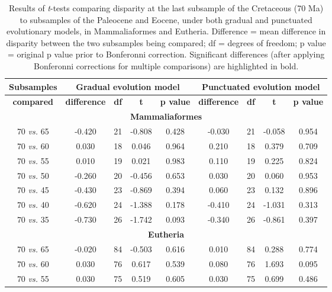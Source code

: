 \documentclass[10pt,letterpaper]{article}
\begin{document}
\begin{table}[ht]
\caption{\scriptsize{Results of \textit{t}-tests comparing disparity at the last subsample of the Cretaceous (70 Ma) to subsamples of the Paleocene and Eocene, under both gradual and punctuated evolutionary models, in Mammaliaformes and Eutheria. Difference = mean difference in disparity between the two subsamples being compared; df = degrees of freedom; p value = original p value prior to Bonferonni correction. Significant differences (after applying Bonferonni corrections for multiple comparisons) are highlighted in bold.}}
\label{tab:Tab_results}
\centering
\begin{tabular}{c|c|c|c|c|c|c|c|c}
  \hline
  \textbf{Subsamples} & \multicolumn{4}{c|}{\textbf{Gradual evolution model}} & \multicolumn{4}{c}{\textbf{Punctuated evolution model}} \\ \hline
  \textbf{compared} & \textbf{difference} & \textbf{df} & \textbf{t} & \textbf{p value} & \textbf{difference} & \textbf{df} & \textbf{t} & \textbf{p value} \\  
  \hline
  \multicolumn{9}{c}{\textbf{Mammaliaformes}}\\
  \hline
  70 \textit{vs.} 65 & -0.420 & 21 & -0.808 & 0.428 & -0.030 & 21 & -0.058 & 0.954 \\ \hline
  70 \textit{vs.} 60 & 0.030 & 18 & 0.046 & 0.964 & 0.210 & 18 & 0.379 & 0.709 \\ \hline
  70 \textit{vs.} 55 & 0.010 & 19 & 0.021 & 0.983 & 0.110 & 19 & 0.225 & 0.824 \\ \hline
  70 \textit{vs.} 50 & -0.260 & 20 & -0.456 & 0.653 & 0.030 & 20 & 0.060 & 0.953 \\ \hline
  70 \textit{vs.} 45 & -0.430 & 23 & -0.869 & 0.394 & 0.060 & 23 & 0.132 & 0.896 \\ \hline
  70 \textit{vs.} 40 & -0.620 & 24 & -1.388 & 0.178 & -0.410 & 24 & -1.031 & 0.313 \\ \hline
  70 \textit{vs.} 35 & -0.730 & 26 & -1.742 & 0.093 & -0.340 & 26 & -0.861 & 0.397 \\ \hline
  \hline
  \multicolumn{9}{c}{\textbf{Eutheria}}\\
  \hline
  70 \textit{vs.} 65 & -0.020 & 84 & -0.503 & 0.616 & 0.010 & 84 & 0.288 & 0.774 \\ \hline
  70 \textit{vs.} 60 & 0.030 & 76 & 0.617 & 0.539 & 0.080 & 76 & 1.693 & 0.095 \\ \hline
  70 \textit{vs.} 55 & 0.030 & 75 & 0.519 & 0.605 & 0.030 & 75 & 0.699 & 0.486 \\ \hline

\end{tabular}
\end{table}
\end{document}

